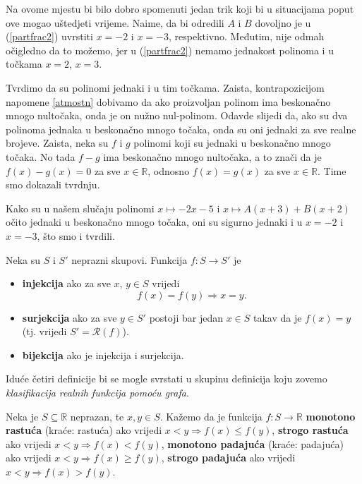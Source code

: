 \begin{remark}
Na ovome mjestu bi bilo dobro spomenuti jedan trik koji bi u situacijama poput ove mogao uštedjeti vrijeme. Naime, da bi odredili \(A\) i \(B\) dovoljno je u (\ref{partfrac2}) uvrstiti \(x=-2\) i \(x=-3\), respektivno. Međutim, nije odmah očigledno da to možemo, jer u (\ref{partfrac2}) nemamo jednakost polinoma i u točkama \(x=2\), \(x=3\). 

Tvrdimo da su polinomi jednaki i u tim točkama. Zaista, kontrapozicijom napomene \ref{atmostn} dobivamo da ako proizvoljan polinom ima beskonačno mnogo nultočaka, onda je on nužno nul-polinom. Odavde slijedi da, ako su dva polinoma jednaka u beskonačno mnogo točaka, onda su oni jednaki za sve realne brojeve. Zaista, neka su \(f\) i \(g\) polinomi koji su jednaki u beskonačno mnogo točaka. No tada \(f-g\) ima beskonačno mnogo nultočaka, a to znači da je \(f(x)-g(x)=0\) za sve $x\in \mathbb{R}$, odnosno \(f(x)=g(x)\) za sve $x\in \mathbb{R}$. Time smo dokazali tvrdnju. 

Kako su u našem slučaju polinomi \(x\mapsto -2x-5\) i \(x\mapsto A(x+3)+B(x+2)\) očito jednaki u beskonačno mnogo točaka, oni su sigurno jednaki i u \(x=-2\) i \(x=-3\), što smo i tvrdili.
\end{remark}
\begin{definition}
\label{bijdef}
Neka su \(S\) i \(S'\) neprazni skupovi. Funkcija \(f : S\to S'\) je
\begin{itemize}
\item \textbf{injekcija} ako za sve \(x\), \(y\in S\) vrijedi \[f(x)=f(y)\Rightarrow x=y.\]
\item \textbf{surjekcija} ako za sve \(y\in S'\) postoji bar jedan \(x\in S\) takav da je \(f(x)=y\) (tj. vrijedi \(S'=\mathcal{R}(f)\)).
\item \textbf{bijekcija} ako je injekcija i surjekcija.
\end{itemize}
\end{definition}
Iduće četiri definicije bi se mogle svrstati u skupinu definicija koju zovemo \textit{klasifikacija realnih funkcija pomoću grafa}.
\begin{definition}
\label{monotonic}
Neka je \(S\subseteq \mathbb{R}\) neprazan, te \(x, y\in S\). Kažemo da je funkcija \(f : S\to \mathbb{R}\) \textbf{monotono rastuća} (kraće: rastuća) ako vrijedi \(x<y\Rightarrow f(x)\leq f(y)\), \textbf{strogo rastuća} ako vrijedi \(x<y\Rightarrow f(x)<f(y)\), \textbf{monotono padajuća} (kraće: padajuća) ako vrijedi \(x<y\Rightarrow f(x)\geq f(y)\), \textbf{strogo padajuća} ako vrijedi \(x<y\Rightarrow f(x)>f(y)\).
\end{definition}
